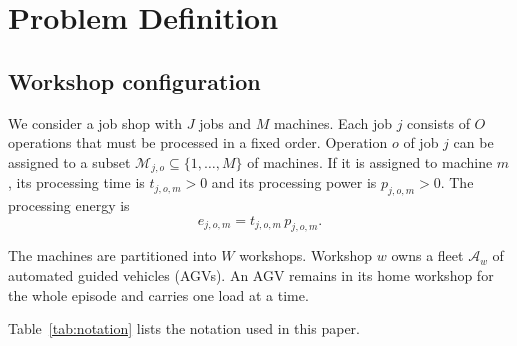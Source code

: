 \section{Problem Definition}
\label{sec:problem}

\subsection{Workshop configuration}

We consider a job shop with $J$ jobs and $M$ machines. Each job $j$ consists
of $O$ operations that must be processed in a fixed order. Operation $o$ of
job $j$ can be assigned to a subset
$\mathcal{M}_{j,o}\subseteq\{1,\ldots,M\}$ of machines. If it is assigned to
machine $m$, its processing time is $t_{j,o,m}>0$ and its processing power is
$p_{j,o,m}>0$. The processing energy is
\begin{equation}
e_{j,o,m}=t_{j,o,m}\,p_{j,o,m}.
\end{equation}

The machines are partitioned into $W$ workshops. Workshop $w$ owns a fleet
$\mathcal{A}_w$ of automated guided vehicles (AGVs). An AGV remains in its
home workshop for the whole episode and carries one load at a time.

Table~\ref{tab:notation} lists the notation used in this paper.

